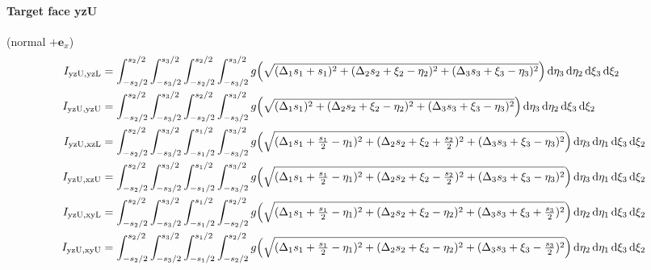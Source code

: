 \paragraph{Target face yzU} (normal $+\mathbf{e}_x$)
\begin{align*}
I_{\mathrm{yzU},\mathrm{yzL}} &= \int_{-s_2/2}^{s_2/2}\int_{-s_3/2}^{s_3/2}\int_{-s_2/2}^{s_2/2}\int_{-s_3/2}^{s_3/2} g\Bigl(\sqrt{(\Delta_1 s_1 + s_1)^2 + (\Delta_2 s_2 + \xi_2 - \eta_2)^2 + (\Delta_3 s_3 + \xi_3 - \eta_3)^2}\Bigr)\,\mathrm{d}\eta_3\,\mathrm{d}\eta_2\,\mathrm{d}\xi_3\,\mathrm{d}\xi_2 \\I_{\mathrm{yzU},\mathrm{yzU}} &= \int_{-s_2/2}^{s_2/2}\int_{-s_3/2}^{s_3/2}\int_{-s_2/2}^{s_2/2}\int_{-s_3/2}^{s_3/2} g\Bigl(\sqrt{(\Delta_1 s_1)^2 + (\Delta_2 s_2 + \xi_2 - \eta_2)^2 + (\Delta_3 s_3 + \xi_3 - \eta_3)^2}\Bigr)\,\mathrm{d}\eta_3\,\mathrm{d}\eta_2\,\mathrm{d}\xi_3\,\mathrm{d}\xi_2 \\I_{\mathrm{yzU},\mathrm{xzL}} &= \int_{-s_2/2}^{s_2/2}\int_{-s_3/2}^{s_3/2}\int_{-s_1/2}^{s_1/2}\int_{-s_3/2}^{s_3/2} g\Bigl(\sqrt{(\Delta_1 s_1 + \tfrac{s_1}{2} - \eta_1)^2 + (\Delta_2 s_2 + \xi_2 + \tfrac{s_2}{2})^2 + (\Delta_3 s_3 + \xi_3 - \eta_3)^2}\Bigr)\,\mathrm{d}\eta_3\,\mathrm{d}\eta_1\,\mathrm{d}\xi_3\,\mathrm{d}\xi_2 \\I_{\mathrm{yzU},\mathrm{xzU}} &= \int_{-s_2/2}^{s_2/2}\int_{-s_3/2}^{s_3/2}\int_{-s_1/2}^{s_1/2}\int_{-s_3/2}^{s_3/2} g\Bigl(\sqrt{(\Delta_1 s_1 + \tfrac{s_1}{2} - \eta_1)^2 + (\Delta_2 s_2 + \xi_2 - \tfrac{s_2}{2})^2 + (\Delta_3 s_3 + \xi_3 - \eta_3)^2}\Bigr)\,\mathrm{d}\eta_3\,\mathrm{d}\eta_1\,\mathrm{d}\xi_3\,\mathrm{d}\xi_2 \\I_{\mathrm{yzU},\mathrm{xyL}} &= \int_{-s_2/2}^{s_2/2}\int_{-s_3/2}^{s_3/2}\int_{-s_1/2}^{s_1/2}\int_{-s_2/2}^{s_2/2} g\Bigl(\sqrt{(\Delta_1 s_1 + \tfrac{s_1}{2} - \eta_1)^2 + (\Delta_2 s_2 + \xi_2 - \eta_2)^2 + (\Delta_3 s_3 + \xi_3 + \tfrac{s_3}{2})^2}\Bigr)\,\mathrm{d}\eta_2\,\mathrm{d}\eta_1\,\mathrm{d}\xi_3\,\mathrm{d}\xi_2 \\I_{\mathrm{yzU},\mathrm{xyU}} &= \int_{-s_2/2}^{s_2/2}\int_{-s_3/2}^{s_3/2}\int_{-s_1/2}^{s_1/2}\int_{-s_2/2}^{s_2/2} g\Bigl(\sqrt{(\Delta_1 s_1 + \tfrac{s_1}{2} - \eta_1)^2 + (\Delta_2 s_2 + \xi_2 - \eta_2)^2 + (\Delta_3 s_3 + \xi_3 - \tfrac{s_3}{2})^2}\Bigr)\,\mathrm{d}\eta_2\,\mathrm{d}\eta_1\,\mathrm{d}\xi_3\,\mathrm{d}\xi_2
\end{align*}

